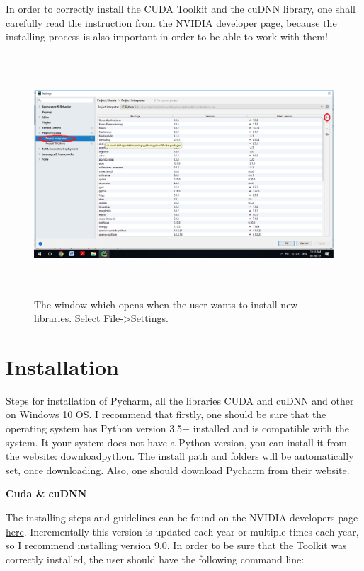 \documentclass[12pt,a4paper,twoside]{report}
\begin{document}
In order to correctly install the CUDA Toolkit and the cuDNN library, one shall carefully read the instruction from the NVIDIA developer page, because the installing process is also important in order to be able to work with them! \par

\begin{figure}[h!]
	\centering
	\includegraphics[width=15cm, height=9cm]{img/data/imagelibraryinstall.png}
	\caption[]
	{The window which opens when the user wants to install new libraries. Select File->Settings.}
	\label{fig:imagelibraryinstall}
\end{figure}


\section{Installation}
Steps for installation of Pycharm, all the libraries CUDA and cuDNN and other on Windows 10 OS. I recommend that firstly, one should be sure that the operating system has Python version 3.5+ installed and is compatible with the system. It your system does not have a Python version, you can install it from the website:  \href{https://www.python.org/downloads/}{downloadpython}. The install path and folders will be automatically set, once downloading. Also, one should download Pycharm from their \href{https://www.jetbrains.com/pycharm/download/}{website}.\newline

\textbf{Cuda \& cuDNN}\newline

The installing steps and guidelines can be found on the NVIDIA developers page \href{https://docs.nvidia.com/cuda/cuda-installation-guide-microsoft-windows/}{here}. Incrementally this version is updated each year or multiple times each year, so I recommend installing version 9.0. In order to be sure that the Toolkit was correctly installed, the user should have the following command line:\newline
\end{document}

